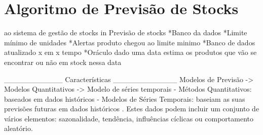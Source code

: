 \section{Algoritmo de Previsão de Stocks}\label{sec43}

 ao sistema de gestão de stocks in
Previsão de stocks
*Banco da dados
*Limite mínimo de unidades
*Alertas produto chegou ao limite minimo
*Banco de dados atualizado x em x tempo
*Oráculo dado uma data estima os produtos que vão se encontrar ou não em stock nessa data

___________ Características ____________
Modelos de Previsão -> Modelos Quantitativos -> Modelo de séries temporais
- Métodos Quantitativos: baseados em dados históricos
- Modelos de Séries Temporais: baseiam as suas
previsões futuras em dados históricos . Estes dados
podem incluir um conjunto de vários elementos:
sazonalidade, tendência, influências cíclicas ou
comportamento aleatório.
